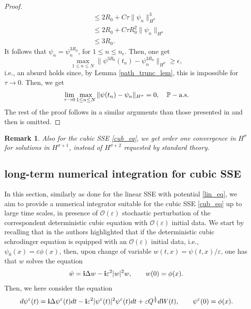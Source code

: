 \documentclass[a4paper]{amsart}
\newtheorem{remark}{Remark}[section]
\begin{document}
\begin{proof}
\begin{align*}
&\le 2 R_0+C \tau \|\psi_n\|_{H^\sigma}^3\\
&\le 2 R_0+C \tau R_0^2\|\psi_n\|_{H^\sigma}\\
&\le 3 R_0.
    \end{align*}
   It follows that $\psi_n=\psi^{3R_0}_n$, for $1\le n\le n_\epsilon$. Then, one get
    $$
    \max_{1\le n\le N}\|\psi^{3 R_0}(t_n)-\psi^{3 R_0}_n\|_{H^\sigma}\ge \epsilon, 
    $$
    i.e., an absurd holds since, by Lemma \ref{path_trunc_lem}, this is impossible for $\tau\to 0$. Then, we get
    $$
   \lim_{\tau \to 0} \max_{1\le n\le N}\|\psi(t_n)-\psi_n\|_{H^\sigma}=0, \quad \mathbb{P}-{\rm a.s.}
    $$
    The rest of the proof follows in a similar arguments than those presented in \cite{deb0} and then is omitted.
    \end{proof}

\begin{remark}
    Also for the cubic SSE \eqref{cub_eq}, we get order one convergence in $H^\sigma$ for solutions in $H^{\sigma+1}$, instead of $H^{\sigma+2}$ requested by standard theory.
\end{remark}

\subsection{long-term numerical integration for cubic SSE}
In this section, similarly as done for the linear SSE with potential \eqref{lin_eq}, we aim to provide a numerical integrator suitable for the cubic SSE \eqref{cub_eq} up to large time scales, in presence of $\mathcal{O}(\varepsilon)$ stochastic perturbation of the correspondent deterministic cubic equation with $\mathcal{O}(\varepsilon)$ initial data. We start by recalling that in \cite{fe_ka} the authors highlighted that if the deterministic cubic schrodinger equation is equipped with an $\mathcal{O}(\varepsilon)$ initial data, i.e., $\psi_0(x)=\varepsilon \phi(x)$, then, upon change of variable $w(t,x)=\psi(t,x)/\varepsilon$, one has that $w$ solves the equation
$$
\dot{w}={\bf i}\Delta w-{\bf i}\varepsilon^2 |w|^2 w, \qquad w(0)=\phi(x).
$$
Then, we here consider the equation
\begin{equation}
    \label{cub_small}
    d\psi^\varepsilon(t)={\bf i}\Delta \psi^\varepsilon(t) dt-{\bf i}\varepsilon^2 |\psi^\varepsilon(t)|^2\psi^\varepsilon(t)dt+\varepsilon Q^{\frac{1}{2}}dW(t), \qquad \psi^\varepsilon(0)=\phi(x).
\end{equation}
\end{document}
